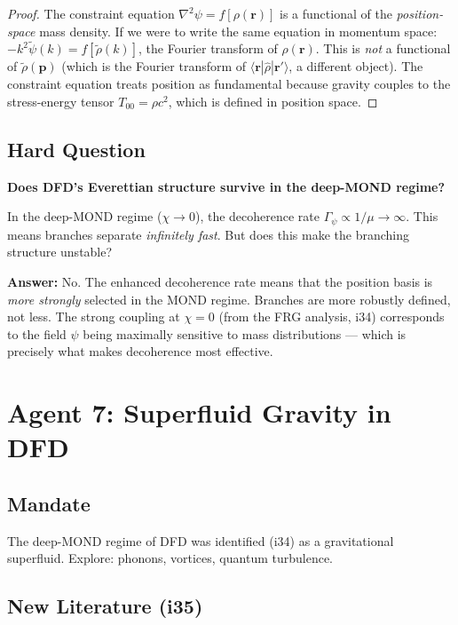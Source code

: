 \documentclass[11pt,a4paper]{article}
\begin{document}
\begin{proof}
The constraint equation $\nabla^2\psi = f[\rho(\mathbf{r})]$ is a functional of the \emph{position-space} mass density. If we were to write the same equation in momentum space: $-k^2\tilde\psi(k) = f[\tilde\rho(k)]$, the Fourier transform of $\rho(\mathbf{r})$. This is \emph{not} a functional of $\tilde\rho(\mathbf{p})$ (which is the Fourier transform of $\langle\mathbf{r}|\hat\rho|\mathbf{r}'\rangle$, a different object). The constraint equation treats position as fundamental because gravity couples to the stress-energy tensor $T_{00} = \rho c^2$, which is defined in position space.
\end{proof}

\subsection{Hard Question}

\textbf{Does DFD's Everettian structure survive in the deep-MOND regime?}

In the deep-MOND regime ($\chi \to 0$), the decoherence rate $\Gamma_\psi \propto 1/\mu \to \infty$. This means branches separate \emph{infinitely fast}. But does this make the branching structure unstable?

\textbf{Answer:} No. The enhanced decoherence rate means that the position basis is \emph{more strongly} selected in the MOND regime. Branches are more robustly defined, not less. The strong coupling at $\chi = 0$ (from the FRG analysis, i34) corresponds to the field $\psi$ being maximally sensitive to mass distributions --- which is precisely what makes decoherence most effective.

\newpage
\section{Agent 7: Superfluid Gravity in DFD}
\label{sec:agent7}

\subsection{Mandate}

The deep-MOND regime of DFD was identified (i34) as a gravitational superfluid. Explore: phonons, vortices, quantum turbulence.

\subsection{New Literature (i35)}
\end{document}
